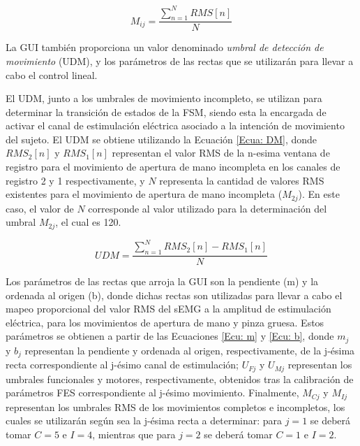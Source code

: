 
\begin{equation}
	M_{ij} = \frac{\sum_{n=1}^{N}RMS[n]}{N}
	\label{Ecu: U_RMS}
\end{equation}

La GUI también proporciona un valor denominado \emph{umbral de detección de movimiento} (UDM), y los parámetros de las rectas que se utilizarán para llevar a cabo el control lineal.

El UDM, junto a los umbrales de movimiento incompleto, se utilizan para determinar la transición de estados de la FSM, siendo esta la encargada de activar el canal de estimulación eléctrica asociado a la intención de movimiento del sujeto. El UDM se obtiene utilizando la Ecuación \ref{Ecua: DM}, donde $RMS_{2}[n]$ y $RMS_{1}[n]$ representan el valor RMS de la n-esima ventana de registro para el movimiento de apertura de mano incompleta en los canales de registro 2 y 1 respectivamente, y $N$ representa la cantidad de valores RMS existentes para el movimiento de apertura de mano incompleta ($M_{2j}$). En este caso, el valor de $N$ corresponde al valor utilizado para la determinación del umbral $M_{2j}$, el cual es 120.

\begin{equation}
	UDM = \frac{\sum_{n=1}^{N}RMS_{2}[n]-RMS_{1}[n]}{N}
	\label{Ecua: DM}
\end{equation}

Los parámetros de las rectas que arroja la GUI son la pendiente (m) y la ordenada al origen (b), donde dichas rectas son utilizadas para llevar a cabo el mapeo proporcional del valor RMS del sEMG a la amplitud de estimulación eléctrica, para los movimientos de apertura de mano y pinza gruesa. Estos parámetros se obtienen a partir de las Ecuaciones \ref{Ecu: m} y \ref{Ecu: b}, donde $m_{j}$ y $b_{j}$ representan la pendiente y ordenada al origen, respectivamente, de la j-ésima recta correspondiente al j-ésimo canal de estimulación; $U_{Fj}$ y $U_{Mj}$ representan los umbrales funcionales y motores, respectivamente, obtenidos tras la calibración de parámetros FES correspondiente al j-ésimo movimiento. Finalmente, $M_{Cj}$ y $M_{Ij}$ representan los umbrales RMS de los movimientos completos e incompletos, los cuales se utilizarán según sea la j-ésima recta a determinar: para $j=1$ se deberá tomar $C=5$ e $I=4$, mientras que para $j=2$ se deberá tomar $C=1$ e $I=2$.

